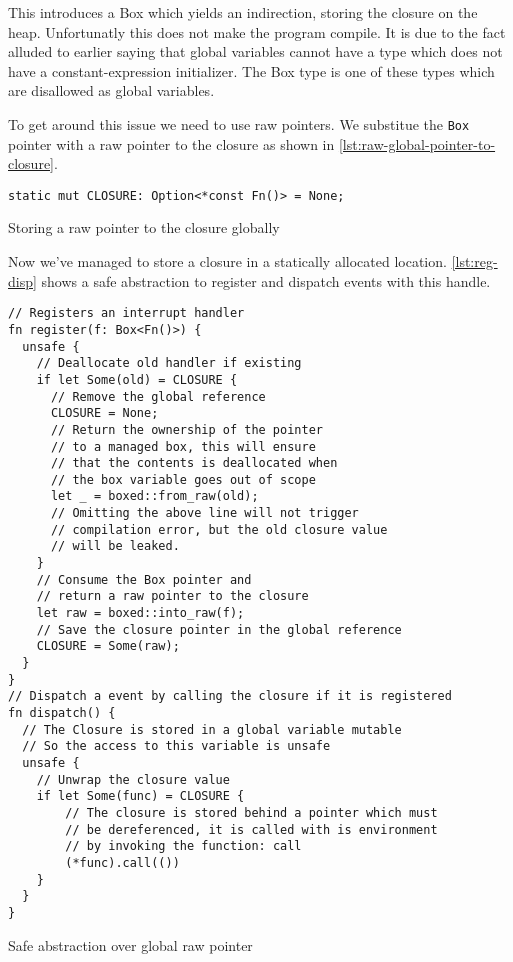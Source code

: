 This introduces a Box which yields an indirection, storing the closure on the heap.
Unfortunatly this does not make the program compile.
It is due to the fact alluded to earlier saying that global variables cannot have a type which does not have a constant-expression initializer.
The Box type is one of these types which are disallowed as global variables.

To get around this issue we need to use raw pointers.
We substitue the \texttt{Box} pointer with a raw pointer to the closure as shown in \autoref{lst:raw-global-pointer-to-closure}.

\begin{listing}[H]
  \begin{verbatim}
static mut CLOSURE: Option<*const Fn()> = None;
  \end{verbatim}
  \caption{Storing a raw pointer to the closure globally}
  \label{lst:raw-global-pointer-to-closure}
\end{listing}

Now we've managed to store a closure in a statically allocated location.
\autoref{lst:reg-disp} shows a safe abstraction to register and dispatch events with this handle.

\begin{listing}[H]
  \begin{verbatim}
// Registers an interrupt handler
fn register(f: Box<Fn()>) {
  unsafe {
    // Deallocate old handler if existing
    if let Some(old) = CLOSURE {
      // Remove the global reference
      CLOSURE = None;
      // Return the ownership of the pointer
      // to a managed box, this will ensure
      // that the contents is deallocated when
      // the box variable goes out of scope
      let _ = boxed::from_raw(old);
      // Omitting the above line will not trigger
      // compilation error, but the old closure value
      // will be leaked.
    }
    // Consume the Box pointer and
    // return a raw pointer to the closure
    let raw = boxed::into_raw(f);
    // Save the closure pointer in the global reference
    CLOSURE = Some(raw);
  }
}
// Dispatch a event by calling the closure if it is registered
fn dispatch() {
  // The Closure is stored in a global variable mutable
  // So the access to this variable is unsafe
  unsafe {
    // Unwrap the closure value
    if let Some(func) = CLOSURE {
        // The closure is stored behind a pointer which must
        // be dereferenced, it is called with is environment
        // by invoking the function: call
        (*func).call(())
    }
  }
}
  \end{verbatim}
  \caption{Safe abstraction over global raw pointer}
  \label{lst:reg-disp}
\end{listing}

